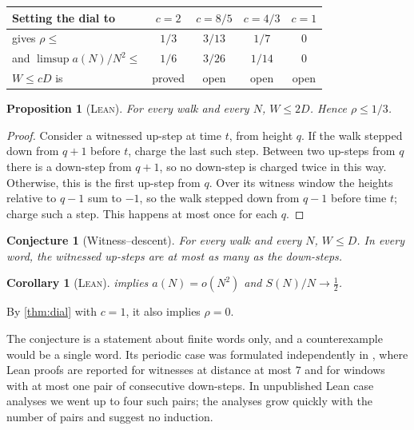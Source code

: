 \documentclass[11pt]{amsart}
\newtheorem{proposition}[theorem]{Proposition}
\newtheorem{corollary}[theorem]{Corollary}
\newtheorem{conjecture}[theorem]{Conjecture}
\theoremstyle{definition}
\newcommand{\LEAN}{\textsc{Lean}}
\begin{document}
\begin{center}
\begin{tabular}{@{}lcccc@{}}
\toprule
Setting the dial to & $c=2$ & $c=8/5$ & $c=4/3$ & $c=1$\\
\midrule
gives $\rho\le$ & $1/3$ & $3/13$ & $1/7$ & $0$ \\
and $\limsup a(N)/N^2\le$ & $1/6$ & $3/26$ & $1/14$ & $0$ \\
\midrule
$W\le cD$ is & proved & open & open & open\\
\bottomrule
\end{tabular}
\end{center}

\begin{proposition}[\LEAN]\label{prop:two}
For every walk and every $N$, $W\le2D$. Hence $\rho\le1/3$.
\end{proposition}

\begin{proof}
Consider a witnessed up-step at time $t$, from height $q$. If the walk stepped down from $q+1$ before $t$, charge the last
such step. Between two up-steps from $q$ there is a down-step from $q+1$, so no down-step is charged twice in this way.
Otherwise, this is the first up-step from $q$. Over its witness window the heights relative to $q-1$ sum
to $-1$, so the walk stepped down from $q-1$ before time $t$; charge such a step. This happens at most once for each $q$.
\end{proof}

\begin{conjecture}[Witness--descent]\label{conj:wd}
For every walk and every $N$, $W\le D$. In every word, the witnessed up-steps are at most as many as the down-steps.
\end{conjecture}

\begin{corollary}[\LEAN]
 implies $a(N)=o(N^2)$ and $S(N)/N\to\frac12$.
\end{corollary}

By \cref{thm:dial} with $c=1$, it also implies $\rho=0$.

The conjecture is a statement about finite words only, and a counterexample would be a single word. Its periodic case was
formulated independently in \cite{HirokiDaichi}, where Lean proofs are reported for witnesses at distance at most $7$ and for windows
with at most one pair of consecutive down-steps. In unpublished Lean case analyses we went up to four such pairs; the analyses
grow quickly with the number of pairs and suggest no induction.
\end{document}
